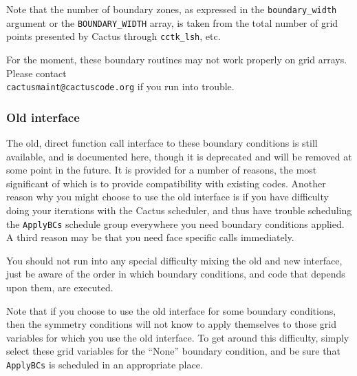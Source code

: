 \documentclass{article}
\begin{document}
Note that the number of boundary zones, as expressed in the
\texttt{boundary\_width} argument or the \texttt{BOUNDARY\_WIDTH}
array, is taken from the total number of grid points presented by
Cactus through \texttt{cctk\_lsh}, etc.  

For the moment, these boundary routines may not work properly on
grid arrays.  
Please contact\\ \texttt{cactusmaint@cactuscode.org} if
you run into trouble.

\subsubsection{Old interface}

The old, direct function call interface to these boundary conditions
is still available, and is documented here, though it is deprecated
and will be removed at some point in the future.  It is provided for a
number of reasons, the most significant of which is to provide
compatibility with existing codes.  Another reason why you might
choose to use the old interface is if you have difficulty doing your
iterations with the Cactus scheduler, and thus have trouble scheduling
the \texttt{ApplyBCs} schedule group everywhere you need boundary
conditions applied.  A third reason may be that you need face specific
calls immediately.

You should not run into any special difficulty mixing the old and new
interface, just be aware of the order in which boundary conditions, and
code that depends upon them, are executed.

Note that if you choose to use the old interface for some boundary
conditions, then the symmetry conditions will not know to apply
themselves to those grid variables for which you use the old
interface.  To get around this difficulty, simply select these grid
variables for the ``None'' boundary condition, and be sure that
\texttt{ApplyBCs} is scheduled in an appropriate place.
\end{document}
